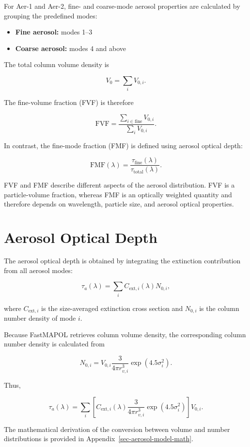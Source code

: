 \documentclass[
  11pt,
  letterpaper,
]{scrreprt}
\providecommand{\tightlist}{%
  \setlength{\itemsep}{0pt}\setlength{\parskip}{0pt}}
\begin{document}
For Aer-1 and Aer-2, fine- and coarse-mode aerosol properties are
calculated by grouping the predefined modes:

\begin{itemize}
\tightlist
\item
  \textbf{Fine aerosol:} modes 1--3
\item
  \textbf{Coarse aerosol:} modes 4 and above
\end{itemize}

The total column volume density is

\[
V_0=\sum_i V_{0,i}.
\]

The fine-volume fraction (FVF) is therefore

\[
\mathrm{FVF}
=
\frac{
\sum_{i\in\mathrm{fine}}V_{0,i}
}{
\sum_i V_{0,i}
}.
\]

In contrast, the fine-mode fraction (FMF) is defined using aerosol
optical depth:

\[
\mathrm{FMF}(\lambda)
=
\frac{
\tau_{\mathrm{fine}}(\lambda)
}{
\tau_{\mathrm{total}}(\lambda)
}.
\]

FVF and FMF describe different aspects of the aerosol distribution. FVF
is a particle-volume fraction, whereas FMF is an optically weighted
quantity and therefore depends on wavelength, particle size, and aerosol
optical properties.

\section{Aerosol Optical Depth}\label{aerosol-optical-depth}

The aerosol optical depth is obtained by integrating the extinction
contribution from all aerosol modes:

\[
\tau_a(\lambda)
=
\sum_i
C_{\mathrm{ext},i}(\lambda)N_{0,i},
\]

where \(C_{\mathrm{ext},i}\) is the size-averaged extinction cross
section and \(N_{0,i}\) is the column number density of mode \(i\).

Because FastMAPOL retrieves column volume density, the corresponding
column number density is calculated from

\[
N_{0,i}
=
V_{0,i}
\frac{3}{4\pi r_{v,i}^3}
\exp(4.5\sigma_i^2).
\]

Thus,

\[
\tau_a(\lambda)
=
\sum_i
\left[
C_{\mathrm{ext},i}(\lambda)
\frac{3}{4\pi r_{v,i}^3}
\exp(4.5\sigma_i^2)
\right]
V_{0,i}.
\]

The mathematical derivation of the conversion between volume and number
distributions is provided in Appendix~\ref{sec-aerosol-model-math}.
\end{document}

